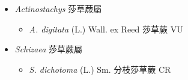 
  \begin{itemize}
 \item[] \textit{Actinostachys} 莎草蕨屬
                                
  \begin{itemize}
        \item[] \textit{A. digitata} (L.) Wall. ex Reed  莎草蕨   VU
  \end{itemize}
 \item[] \textit{Schizaea} 莎草蕨屬
                                
  \begin{itemize}
        \item[] \textit{S. dichotoma} (L.) Sm.  分枝莎草蕨   CR
  \end{itemize}
  \end{itemize}

